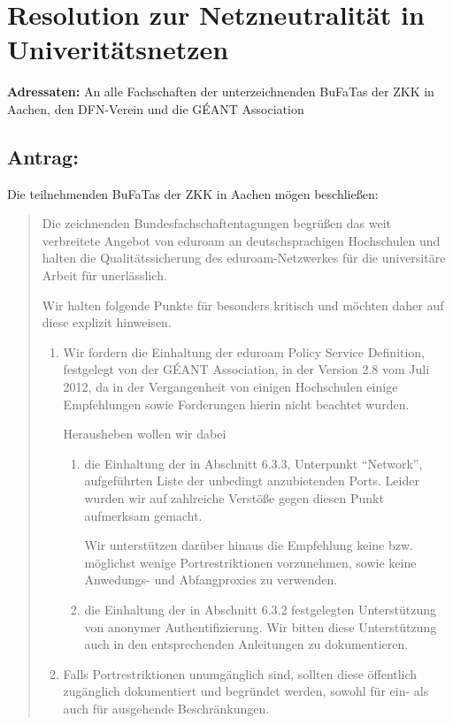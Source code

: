 \documentclass[12pt,oneside]{scrartcl}
\begin{document}
\section*{Resolution zur Netzneutralität in Univeritätsnetzen}

\textbf{Adressaten:} An alle Fachschaften der unterzeichnenden BuFaTas der ZKK
in Aachen, den DFN-Verein und die GÉANT Association

\subsection*{Antrag:}
Die teilnehmenden BuFaTas der ZKK in Aachen mögen beschließen:
\begin{quote}
  Die zeichnenden Bundesfachschaftentagungen begrüßen das weit verbreitete
  Angebot von eduroam an deutschsprachigen Hochschulen und halten die
  Qualitätssicherung des eduroam-Netzwerkes für die universitäre Arbeit für
  unerlässlich.

  Wir halten folgende Punkte für besonders kritisch und möchten daher auf diese
  explizit hinweisen.

  \begin{enumerate}
  \item Wir fordern die Einhaltung der eduroam Policy Service Definition,
    festgelegt von der GÉANT Association, in der Version 2.8 vom Juli 2012, da
    in der Vergangenheit von einigen Hochschulen einige Empfehlungen sowie
    Forderungen hierin nicht beachtet wurden.

    Herausheben wollen wir dabei
    \begin{enumerate}
    \item  die Einhaltung der in Abschnitt 6.3.3, Unterpunkt "`Network"',
      aufgeführten Liste der unbedingt anzubietenden Ports. Leider wurden wir
      auf zahlreiche Verstöße gegen diesen Punkt aufmerksam gemacht.

      Wir unterstützen darüber hinaus die Empfehlung keine
      bzw. möglichst wenige Portrestriktionen vorzunehmen, sowie keine
      Anwedungs- und Abfangproxies zu verwenden.

    \item die Einhaltung der in Abschnitt 6.3.2 festgelegten Unterstützung von
      anonymer Authentifizierung. Wir bitten diese Unterstützung auch in den
      entsprechenden Anleitungen zu dokumentieren.
    \end{enumerate}
  \item Falls Portrestriktionen unumgänglich sind, sollten diese öffentlich
    zugänglich dokumentiert und begründet werden, sowohl für ein- als auch für
    ausgehende Beschränkungen.


\end{enumerate}
\end{quote}
\end{document}
